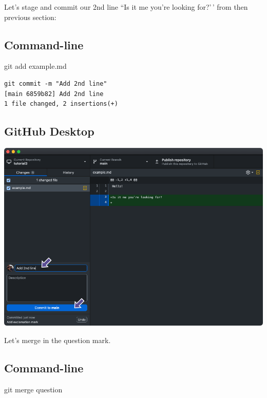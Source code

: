 \documentclass[
  letterpaper,
  DIV=11,
  numbers=noendperiod]{scrartcl}
\newenvironment{Shaded}{\begin{snugshade}}{\end{snugshade}}
\newcommand{\FunctionTok}[1]{\textcolor[rgb]{0.28,0.35,0.67}{#1}}
\newcommand{\NormalTok}[1]{\textcolor[rgb]{0.00,0.23,0.31}{#1}}
\begin{document}
Let's stage and commit our 2nd line ``Is it me you're looking for?'\,'
from then previous section:

\subsection{Command-line}

\begin{Shaded}
\begin{Highlighting}[]
\FunctionTok{git}\NormalTok{ add example.md}
\end{Highlighting}
\end{Shaded}

\begin{verbatim}
git commit -m "Add 2nd line"
[main 6859b82] Add 2nd line
1 file changed, 2 insertions(+)
\end{verbatim}

\subsection{GitHub Desktop}

\includegraphics{images/image42.png}

Let's merge in the question mark.

\subsection{Command-line}

\begin{Shaded}
\begin{Highlighting}[]
\FunctionTok{git}\NormalTok{ merge question}
\end{Highlighting}
\end{Shaded}
\end{document}
